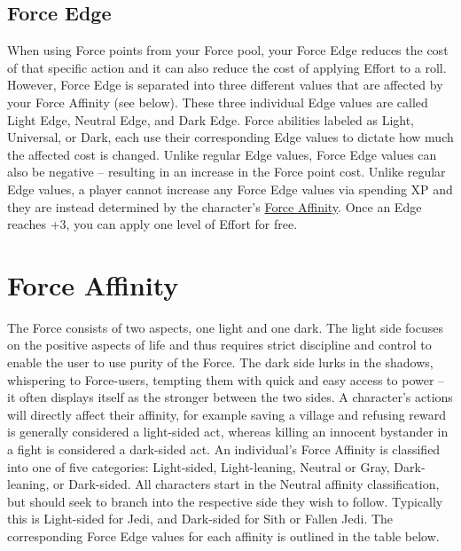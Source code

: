 \documentclass[a4paper,10pt,final,twocolumn,oneside]{book}
\begin{document}

\subsection{Force Edge} %
\label{sub:force_edge}

When using Force points from your Force pool, your Force Edge reduces the cost of that specific action and it can also reduce the cost of applying Effort to a roll. However, Force Edge is separated into three different values that are affected by your Force Affinity (see below). These three individual Edge values are called Light Edge, Neutral Edge, and Dark Edge. Force abilities labeled as Light, Universal, or Dark, each use their corresponding Edge values to dictate how much the affected cost is changed. Unlike regular Edge values, Force Edge values can also be negative -- resulting in an increase in the Force point cost. Unlike regular Edge values, a player cannot increase any Force Edge values via spending XP and they are instead determined by the character's \hyperref[sec:force_affinity]{Force Affinity}. Once an Edge reaches +3, you can apply one level of Effort for free.


\section{Force Affinity} %
\label{sec:force_affinity}

The Force consists of two aspects, one light and one dark. The light side focuses on the positive aspects of life and thus requires strict discipline and control to enable the user to use purity of the Force. The dark side lurks in the shadows, whispering to Force-users, tempting them with quick and easy access to power -- it often displays itself as the stronger between the two sides. A character's actions will directly affect their affinity, for example saving a village and refusing reward is generally considered a light-sided act, whereas killing an innocent bystander in a fight is considered a dark-sided act. An individual's Force Affinity is classified into one of five categories: Light-sided, Light-leaning, Neutral or Gray, Dark-leaning, or Dark-sided. All characters start in the Neutral affinity classification, but should seek to branch into the respective side they wish to follow. Typically this is Light-sided for Jedi, and Dark-sided for Sith or Fallen Jedi. The corresponding Force Edge values for each affinity is outlined in the table below.
\end{document}
